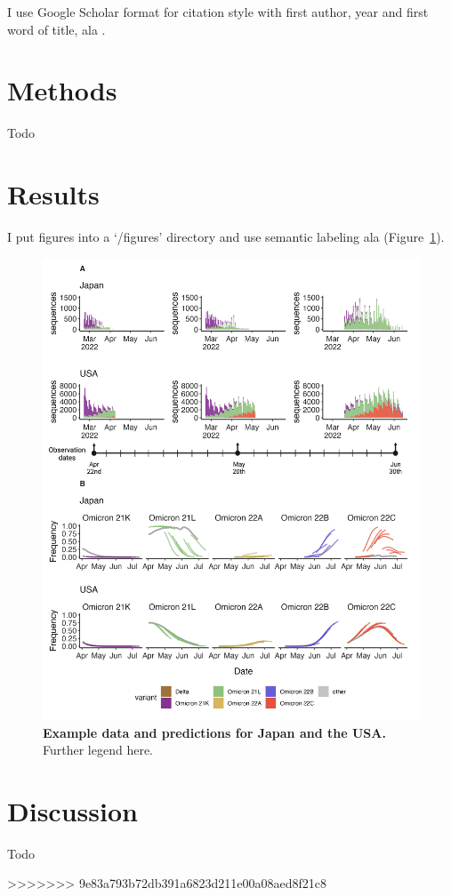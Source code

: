 \documentclass[11pt,oneside,letterpaper]{article}
\begin{document}
I use Google Scholar format for citation style with first author, year and first word of title, ala \cite{hadfield2018nextstrain}.

\section*{Methods}

Todo

\section*{Results}

I put figures into a `/figures' directory and use semantic labeling ala (Figure~\ref{example_predictions}).

\begin{figure}[h]
	\centering
	\includegraphics[width=1.0\textwidth]{figures/example_predictions}
	\caption{\textbf{Example data and predictions for Japan and the USA.}
	Further legend here.
	}
	\label{example_predictions}
\end{figure}

\section*{Discussion}

Todo

>>>>>>> 9e83a793b72db391a6823d211e00a08aed8f21c8


\end{document}
